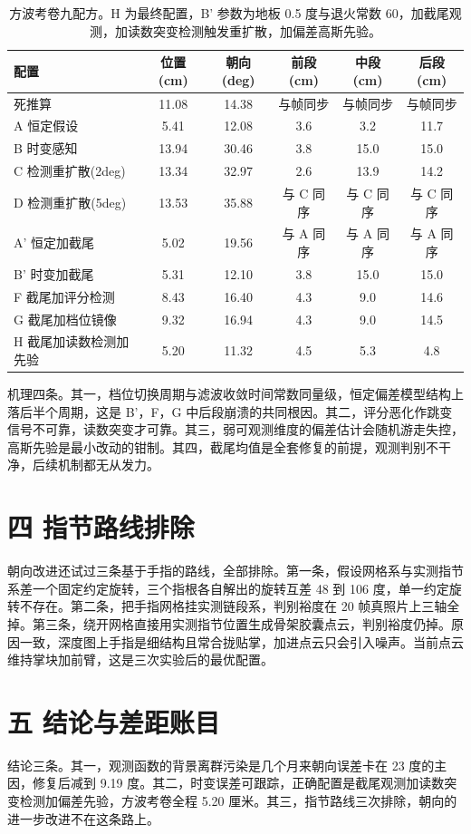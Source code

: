 \documentclass{article}
\begin{document}
\begin{table}[h]
\centering
\begin{tabular}{lccccc}
\toprule
配置 & 位置(cm) & 朝向(deg) & 前段(cm) & 中段(cm) & 后段(cm) \\
\midrule
死推算 & 11.08 & 14.38 & 与帧同步 & 与帧同步 & 与帧同步 \\
A 恒定假设 & 5.41 & 12.08 & 3.6 & 3.2 & 11.7 \\
B 时变感知 & 13.94 & 30.46 & 3.8 & 15.0 & 15.0 \\
C 检测重扩散(2deg) & 13.34 & 32.97 & 2.6 & 13.9 & 14.2 \\
D 检测重扩散(5deg) & 13.53 & 35.88 & 与 C 同序 & 与 C 同序 & 与 C 同序 \\
A' 恒定加截尾 & 5.02 & 19.56 & 与 A 同序 & 与 A 同序 & 与 A 同序 \\
B' 时变加截尾 & 5.31 & 12.10 & 3.8 & 15.0 & 15.0 \\
F 截尾加评分检测 & 8.43 & 16.40 & 4.3 & 9.0 & 14.6 \\
G 截尾加档位镜像 & 9.32 & 16.94 & 4.3 & 9.0 & 14.5 \\
H 截尾加读数检测加先验 & 5.20 & 11.32 & 4.5 & 5.3 & 4.8 \\
\bottomrule
\end{tabular}
\caption{方波考卷九配方。H 为最终配置，B' 参数为地板 0.5 度与退火常数 60，加截尾观测，加读数突变检测触发重扩散，加偏差高斯先验。}
\label{tab:square}
\end{table}

机理四条。其一，档位切换周期与滤波收敛时间常数同量级，恒定偏差模型结构上落后半个周期，这是 B'，F，G 中后段崩溃的共同根因。其二，评分恶化作跳变信号不可靠，读数突变才可靠。其三，弱可观测维度的偏差估计会随机游走失控，高斯先验是最小改动的钳制。其四，截尾均值是全套修复的前提，观测判别不干净，后续机制都无从发力。

\section{四 指节路线排除}
朝向改进还试过三条基于手指的路线，全部排除。第一条，假设网格系与实测指节系差一个固定约定旋转，三个指根各自解出的旋转互差 48 到 106 度，单一约定旋转不存在。第二条，把手指网格挂实测链段系，判别裕度在 20 帧真照片上三轴全掉。第三条，绕开网格直接用实测指节位置生成骨架胶囊点云，判别裕度仍掉。原因一致，深度图上手指是细结构且常合拢贴掌，加进点云只会引入噪声。当前点云维持掌块加前臂，这是三次实验后的最优配置。

\section{五 结论与差距账目}
结论三条。其一，观测函数的背景离群污染是几个月来朝向误差卡在 23 度的主因，修复后减到 9.19 度。其二，时变误差可跟踪，正确配置是截尾观测加读数突变检测加偏差先验，方波考卷全程 5.20 厘米。其三，指节路线三次排除，朝向的进一步改进不在这条路上。
\end{document}
